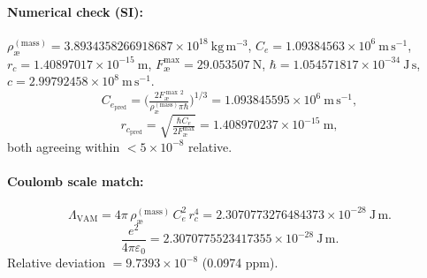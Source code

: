 \documentclass[12pt]{article}
\newcommand{\aeRhoM}{\rho_{\text{\ae}}^{(\text{mass})}}
\newcommand{\Ce}{C_e}
\newcommand{\rc}{r_c}
\newcommand{\Lam}{\Lambda_{\text{VAM}}}
\begin{document}
    \paragraph{Numerical check (SI):}
    \(\aeRhoM=3.8934358266918687\times 10^{18}\ \mathrm{kg\,m^{-3}}\),
    \(\Ce=1.09384563\times 10^{6}\ \mathrm{m\,s^{-1}}\),
    \(\rc=1.40897017\times 10^{-15}\ \mathrm{m}\),
    \(F_{\text{\ae}}^{\max}=29.053507\ \mathrm{N}\),
    \(\hbar=1.054571817\times 10^{-34}\ \mathrm{J\,s}\),
    \(c=2.99792458\times 10^{8}\ \mathrm{m\,s^{-1}}\).
    \[
        \Ce_{\text{pred}}=\Big(\tfrac{2F_{\text{\ae}}^{\max\,2}}{\aeRhoM\pi\hbar}\Big)^{1/3}
        =1.093845595\times 10^{6}\ \mathrm{m\,s^{-1}},
    \]
    \[
        \rc_{\text{pred}}=\sqrt{\tfrac{\hbar\Ce}{2F_{\text{\ae}}^{\max}}}
        =1.408970237\times 10^{-15}\ \mathrm{m},
    \]
    both agreeing within \(<5\times 10^{-8}\) relative.

    \paragraph{Coulomb scale match:}
    \[
        \Lam = 4\pi\,\aeRhoM\,\Ce^2\,\rc^4
        =2.3070773276484373\times 10^{-28}\ \mathrm{J\,m}.
    \]
    \[
        \frac{e^2}{4\pi\varepsilon_0}
        =2.3070775523417355\times 10^{-28}\ \mathrm{J\,m}.
    \]
    Relative deviation \(=9.7393\times 10^{-8}\) (0.0974 ppm).
\end{document}
